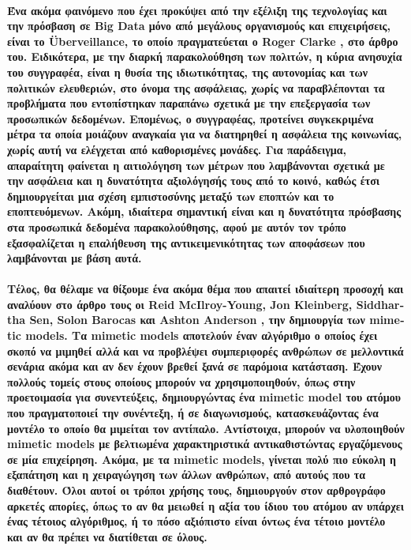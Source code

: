 \documentclass[12pt, A4]{article}
\newcommand{\tl}{\textlatin}
\begin{document}
    \paragraph{Ένα ακόμα φαινόμενο που έχει προκύψει από την εξέλιξη της τεχνολογίας και την πρόσβαση σε \tl{Big Data} μόνο από μεγάλους οργανισμούς και επιχειρήσεις, είναι το \tl{Überveillance}, το οποίο πραγματεύεται ο \tl{Roger Clarke} \cite{article4}, στο άρθρο του. Ειδικότερα, με την διαρκή παρακολούθηση των πολιτών, η κύρια ανησυχία του συγγραφέα, είναι η θυσία της ιδιωτικότητας, της αυτονομίας και των πολιτικών ελευθεριών, στο όνομα της ασφάλειας, χωρίς να παραβλέπονται τα προβλήματα που εντοπίστηκαν παραπάνω σχετικά με την επεξεργασία των προσωπικών δεδομένων. Επομένως, ο συγγραφέας, προτείνει συγκεκριμένα μέτρα τα οποία μοιάζουν αναγκαία για να διατηρηθεί η ασφάλεια της κοινωνίας, χωρίς αυτή να ελέγχεται από καθορισμένες μονάδες. Για παράδειγμα, απαραίτητη φαίνεται η αιτιολόγηση των μέτρων που λαμβάνονται σχετικά με την ασφάλεια και η δυνατότητα αξιολόγησής τους από το κοινό, καθώς έτσι δημιουργείται μια σχέση εμπιστοσύνης μεταξύ των εποπτών και το εποπτευόμενων. Ακόμη, ιδιαίτερα σημαντική είναι και η δυνατότητα πρόσβασης στα προσωπικά δεδομένα παρακολούθησης, αφού με αυτόν τον τρόπο εξασφαλίζεται η επαλήθευση της αντικειμενικότητας των αποφάσεων που λαμβάνονται με βάση αυτά.}

    \paragraph{Τέλος, θα θέλαμε να θίξουμε ένα ακόμα θέμα που απαιτεί ιδιαίτερη προσοχή και αναλύουν στο άρθρο τους οι \tl{Reid McIlroy-Young, Jon Kleinberg, Siddhartha Sen, Solon Barocas} και \tl{Ashton Anderson} \cite{article3}, την δημιουργία των \tl{mimetic models}. Τα \tl{mimetic models} αποτελούν έναν αλγόριθμο ο οποίος έχει σκοπό να μιμηθεί αλλά και να προβλέψει συμπεριφορές ανθρώπων σε μελλοντικά σενάρια ακόμα και αν δεν έχουν βρεθεί ξανά σε παρόμοια κατάσταση. Έχουν πολλούς τομείς στους οποίους μπορούν να χρησιμοποιηθούν, όπως στην προετοιμασία για συνεντεύξεις, δημιουργώντας ένα \tl{mimetic model} του ατόμου που πραγματοποιεί την συνέντεξη, ή σε διαγωνισμούς, κατασκευάζοντας ένα μοντέλο το οποίο θα μιμείται τον αντίπαλο. Αντίστοιχα, μπορούν να υλοποιηθούν \tl{mimetic models} με βελτιωμένα χαρακτηριστικά αντικαθιστώντας εργαζόμενους σε μία επιχείρηση. Ακόμα, με τα \tl{mimetic models}, γίνεται πολύ πιο εύκολη η εξαπάτηση και η χειραγώγηση των άλλων ανθρώπων, από αυτούς που τα διαθέτουν. Όλοι αυτοί οι τρόποι χρήσης τους, δημιουργούν στον αρθρογράφο αρκετές απορίες, όπως το αν θα μειωθεί η αξία του ίδιου του ατόμου αν υπάρχει ένας τέτοιος αλγόριθμος, ή το πόσο αξιόπιστο είναι όντως ένα τέτοιο μοντέλο και αν θα πρέπει να διατίθεται σε όλους.}
\end{document}
